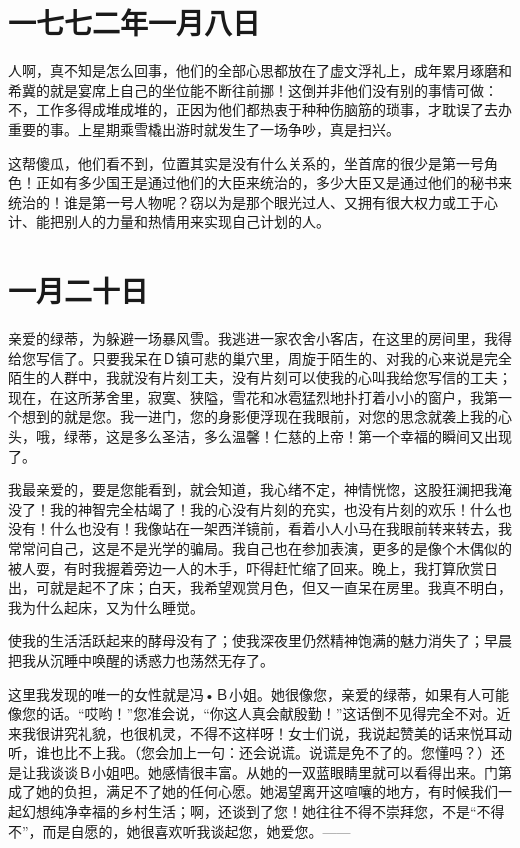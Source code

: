 \documentclass[12pt,oneside]{book}
\begin{document}
\chapter{一七七二年一月八日}
\label{sec-3-4}
人啊，真不知是怎么回事，他们的全部心思都放在了虚文浮礼上，成年累月琢磨和希冀的就是宴席上自己的坐位能不断往前挪！这倒并非他们没有别的事情可做：不，工作多得成堆成堆的，正因为他们都热衷于种种伤脑筋的琐事，才耽误了去办重要的事。上星期乘雪橇出游时就发生了一场争吵，真是扫兴。

这帮傻瓜，他们看不到，位置其实是没有什么关系的，坐首席的很少是第一号角色！正如有多少国王是通过他们的大臣来统治的，多少大臣又是通过他们的秘书来统治的！谁是第一号人物呢？窃以为是那个眼光过人、又拥有很大权力或工于心计、能把别人的力量和热情用来实现自己计划的人。
　　

\chapter{一月二十日}
\label{sec-3-5}
亲爱的绿蒂，为躲避一场暴风雪。我逃进一家农舍小客店，在这里的房间里，我得给您写信了。只要我呆在Ｄ镇可悲的巢穴里，周旋于陌生的、对我的心来说是完全陌生的人群中，我就没有片刻工夫，没有片刻可以使我的心叫我给您写信的工夫；现在，在这所茅舍里，寂寞、狭隘，雪花和冰雹猛烈地扑打着小小的窗户，我第一个想到的就是您。我一进门，您的身影便浮现在我眼前，对您的思念就袭上我的心头，哦，绿蒂，这是多么圣洁，多么温馨！仁慈的上帝！第一个幸福的瞬间又出现了。

我最亲爱的，要是您能看到，就会知道，我心绪不定，神情恍惚，这股狂澜把我淹没了！我的神智完全枯竭了！我的心没有片刻的充实，也没有片刻的欢乐！什么也没有！什么也没有！我像站在一架西洋镜前，看着小人小马在我眼前转来转去，我常常问自己，这是不是光学的骗局。我自己也在参加表演，更多的是像个木偶似的被人耍，有时我握着旁边一人的木手，吓得赶忙缩了回来。晚上，我打算欣赏日出，可就是起不了床；白天，我希望观赏月色，但又一直呆在房里。我真不明白，我为什么起床，又为什么睡觉。

使我的生活活跃起来的酵母没有了；使我深夜里仍然精神饱满的魅力消失了；早晨把我从沉睡中唤醒的诱惑力也荡然无存了。

这里我发现的唯一的女性就是冯•Ｂ小姐。她很像您，亲爱的绿蒂，如果有人可能像您的话。“哎哟！”您准会说，“你这人真会献殷勤！”这话倒不见得完全不对。近来我很讲究礼貌，也很机灵，不得不这样呀！女士们说，我说起赞美的话来悦耳动听，谁也比不上我。（您会加上一句：还会说谎。说谎是免不了的。您懂吗？）还是让我谈谈Ｂ小姐吧。她感情很丰富。从她的一双蓝眼睛里就可以看得出来。门第成了她的负担，满足不了她的任何心愿。她渴望离开这喧嚷的地方，有时候我们一起幻想纯净幸福的乡村生活；啊，还谈到了您！她往往不得不崇拜您，不是“不得不”，而是自愿的，她很喜欢听我谈起您，她爱您。——
\end{document}
